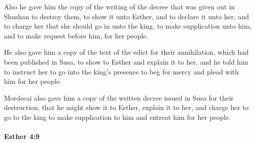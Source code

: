 			\begin{versebox}
					\item[BHS] 
					\item[LXX] 
					\item[ASV] Also he gave him the copy of the writing of the decree that was given out in Shushan to destroy them, to show it unto Esther, and to declare it unto her, and to charge her that she should go in unto the king, to make supplication unto him, and to make request before him, for her people.
					\item[NIV] He also gave him a copy of the text of the edict for their annihilation, which had been published in Susa, to show to Esther and explain it to her, and he told him to instruct her to go into the king’s presence to beg for mercy and plead with him for her people.
					\item[NRSV] Mordecai also gave him a copy of the written decree issued in Susa for their destruction, that he might show it to Esther, explain it to her, and charge her to go to the king to make supplication to him and entreat him for her people.
			\end{versebox}

		\paragraph{Esther 4:9} %
			\label{ESTHER-4-9}

